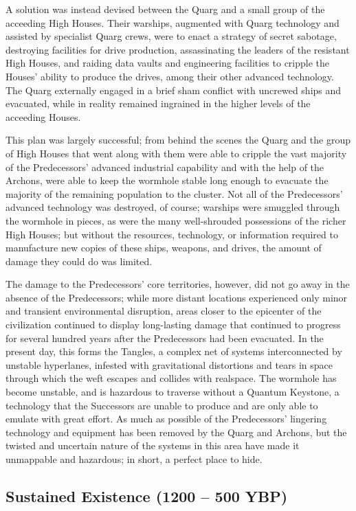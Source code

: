 \documentclass[11pt]{report}
\begin{document}
    A solution was instead devised between the Quarg and a small group of the acceeding High Houses. Their warships, augmented with Quarg technology and assisted by specialist Quarg crews, were to enact a strategy of secret sabotage, destroying facilities for drive production, assassinating the leaders of the resistant High Houses, and raiding data vaults and engineering facilities to cripple the Houses' ability to produce the drives, among their other advanced technology. The Quarg externally engaged in a brief sham conflict with uncrewed ships and evacuated, while in reality remained ingrained in the higher levels of the acceeding Houses.

    This plan was largely successful; from behind the scenes the Quarg and the group of High Houses that went along with them were able to cripple the vast majority of the Predecessors' advanced industrial capability and with the help of the Archons, were able to keep the wormhole stable long enough to evacuate the majority of the remaining population to the cluster. Not all of the Predecessors' advanced technology was destroyed, of course; warships were smuggled through the wormhole in pieces, as were the many well-shrouded possessions of the richer High Houses; but without the resources, technology, or information required to manufacture new copies of these ships, weapons, and drives, the amount of damage they could do was limited.

    The damage to the Predecessors' core territories, however, did not go away in the absence of the Predecessors; while more distant locations experienced only minor and transient environmental disruption, areas closer to the epicenter of the civilization continued to display long-lasting damage that continued to progress for several hundred years after the Predecessors had been evacuated. In the present day, this forms the Tangles, a complex net of systems interconnected by unstable hyperlanes, infested with gravitational distortions and tears in space through which the weft escapes and collides with realspace. The wormhole has become unstable, and is hazardous to traverse without a Quantum Keystone, a technology that the Successors are unable to produce and are only able to emulate with great effort. As much as possible of the Predecessors' lingering technology and equipment has been removed by the Quarg and Archons, but the twisted and uncertain nature of the systems in this area have made it unmappable and hazardous; in short, a perfect place to hide.

    \subsection{Sustained Existence (1200 -- 500 YBP)}
\end{document}
